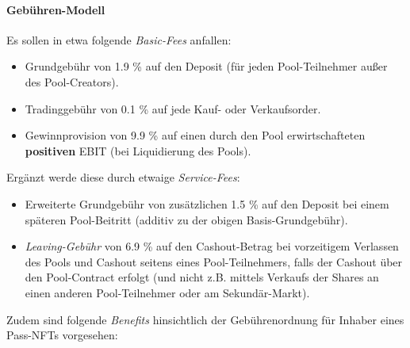
\paragraph{Gebühren-Modell}
\label{fees-model}
\textbf{ }
\vspace{0.2cm}


\vspace{0.3cm}

\begin{Assumption}[Gebühren]\label{fees}

Es sollen in etwa folgende \textit{Basic-Fees} anfallen:

\begin{itemize}
	\item Grundgebühr von 1.9 \% auf den Deposit (für jeden Pool-Teilnehmer außer des Pool-Creators).
	\item Tradinggebühr von 0.1 \% auf jede Kauf- oder Verkaufsorder.
	\item Gewinnprovision von 9.9 \% auf einen durch den Pool erwirtschafteten \textbf{positiven} EBIT (bei Liquidierung des Pools).
\end{itemize}

\vspace{0.2cm}

Ergänzt werde diese durch etwaige \textit{Service-Fees}: 

\begin{itemize}
	\item Erweiterte Grundgebühr von zusätzlichen 1.5 \% auf den Deposit bei einem späteren Pool-Beitritt (additiv zu der obigen Basis-Grundgebühr).
	\item \textit{Leaving-Gebühr} von 6.9 \% auf den Cashout-Betrag bei vorzeitigem Verlassen des Pools und Cashout seitens eines Pool-Teilnehmers, falls der Cashout über den Pool-Contract erfolgt (und nicht z.B. mittels Verkaufs der Shares an einen anderen Pool-Teilnehmer oder am Sekundär-Markt).
\end{itemize}

\vspace{0.2cm}

Zudem sind folgende \textit{Benefits} hinsichtlich der Gebührenordnung für Inhaber eines Pass-NFTs  vorgesehen:


\end{Assumption}
